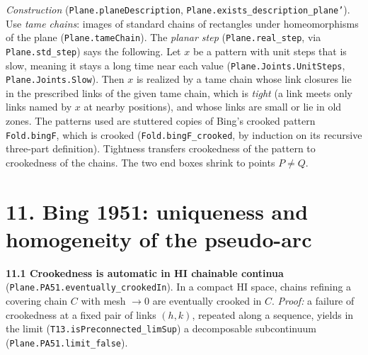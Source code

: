 \documentclass[11pt]{article}
\newcommand{\lean}[1]{\texttt{#1}}
\begin{document}
\emph{Construction} (\lean{Plane.\hspace{0pt}planeDescription}, \lean{Plane.\hspace{0pt}exists\_\hspace{0pt}description\_\hspace{0pt}plane'}). Use \emph{tame chains}: images of standard chains of rectangles under homeomorphisms of the plane (\lean{Plane.\hspace{0pt}tameChain}). The \emph{planar step} (\lean{Plane.\hspace{0pt}real\_\hspace{0pt}step}, via \lean{Plane.\hspace{0pt}std\_\hspace{0pt}step}) says the following. Let $x$ be a pattern with unit steps that is slow, meaning it stays a long time near each value (\lean{Plane.\hspace{0pt}Joints.\hspace{0pt}UnitSteps}, \lean{Plane.\hspace{0pt}Joints.\hspace{0pt}Slow}). Then $x$ is realized by a tame chain whose link closures lie in the prescribed links of the given tame chain, which is \emph{tight} (a link meets only links named by $x$ at nearby positions), and whose links are small or lie in old zones. The patterns used are stuttered copies of Bing's crooked pattern \lean{Fold.\hspace{0pt}bingF}, which is crooked (\lean{Fold.\hspace{0pt}bingF\_\hspace{0pt}crooked}, by induction on its recursive three-part definition). Tightness transfers crookedness of the pattern to crookedness of the chains. The two end boxes shrink to points $P \neq Q$.

\section*{11. Bing 1951: uniqueness and homogeneity of the pseudo-arc}

\textbf{11.1 Crookedness is automatic in HI chainable continua} (\lean{Plane.\hspace{0pt}PA51.\hspace{0pt}eventually\_\hspace{0pt}crookedIn}). In a compact HI space, chains refining a covering chain $C$ with mesh $\to 0$ are eventually crooked in $C$. \emph{Proof:} a failure of crookedness at a fixed pair of links $(h, k)$, repeated along a sequence, yields in the limit (\lean{T13.\hspace{0pt}isPreconnected\_\hspace{0pt}limSup}) a decomposable subcontinuum (\lean{Plane.\hspace{0pt}PA51.\hspace{0pt}limit\_\hspace{0pt}false}).
\end{document}
